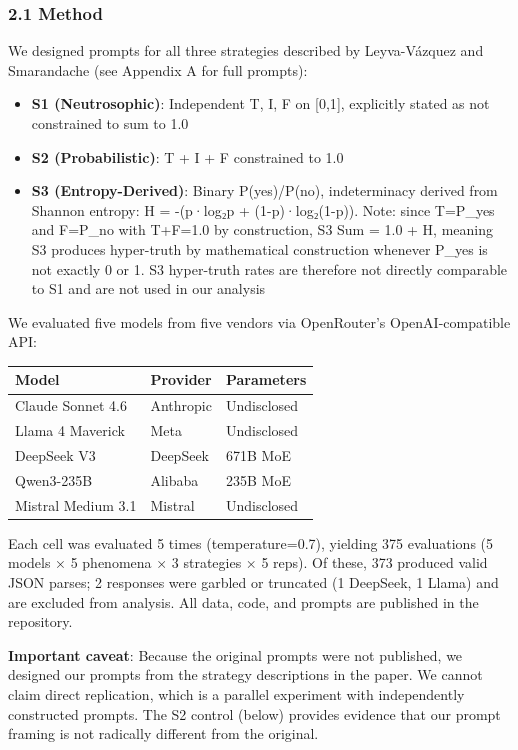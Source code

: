 \documentclass[
]{article}
\providecommand{\tightlist}{%
  \setlength{\itemsep}{0pt}\setlength{\parskip}{0pt}}
\begin{document}
\hypertarget{method}{%
\subsubsection{2.1 Method}\label{method}}

We designed prompts for all three strategies described by Leyva-Vázquez
and Smarandache (see Appendix A for full prompts):

\begin{itemize}
\tightlist
\item
  \textbf{S1 (Neutrosophic)}: Independent T, I, F on {[}0,1{]},
  explicitly stated as not constrained to sum to 1.0
\item
  \textbf{S2 (Probabilistic)}: T + I + F constrained to 1.0
\item
  \textbf{S3 (Entropy-Derived)}: Binary P(yes)/P(no), indeterminacy
  derived from Shannon entropy: H = -(p·log₂p + (1-p)·log₂(1-p)). Note:
  since T=P\_yes and F=P\_no with T+F=1.0 by construction, S3 Sum = 1.0
  + H, meaning S3 produces hyper-truth by mathematical construction
  whenever P\_yes is not exactly 0 or 1. S3 hyper-truth rates are
  therefore not directly comparable to S1 and are not used in our
  analysis
\end{itemize}

We evaluated five models from five vendors via OpenRouter's
OpenAI-compatible API:

\begin{longtable}[]{@{}lll@{}}
\toprule\noalign{}
Model & Provider & Parameters \\
\midrule\noalign{}
\endhead
\bottomrule\noalign{}
\endlastfoot
Claude Sonnet 4.6 & Anthropic & Undisclosed \\
Llama 4 Maverick & Meta & Undisclosed \\
DeepSeek V3 & DeepSeek & 671B MoE \\
Qwen3-235B & Alibaba & 235B MoE \\
Mistral Medium 3.1 & Mistral & Undisclosed \\
\end{longtable}

Each cell was evaluated 5 times (temperature=0.7), yielding 375
evaluations (5 models × 5 phenomena × 3 strategies × 5 reps). Of these,
373 produced valid JSON parses; 2 responses were garbled or truncated (1
DeepSeek, 1 Llama) and are excluded from analysis. All data, code, and
prompts are published in the repository.

\textbf{Important caveat}: Because the original prompts were not
published, we designed our prompts from the strategy descriptions in the
paper. We cannot claim direct replication, which is a parallel
experiment with independently constructed prompts. The S2 control
(below) provides evidence that our prompt framing is not radically
different from the original.
\end{document}
